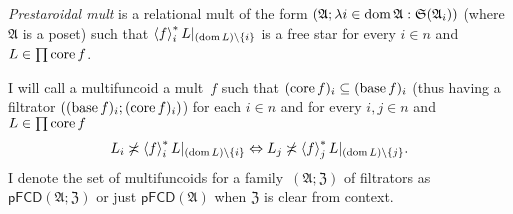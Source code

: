 \begin{defn}
\emph{Prestaroidal mult} is a relational mult of the form $(\mathfrak{A};\lambda i\in\operatorname{dom}\mathfrak{A}:\mathfrak{S}(\mathfrak{A}_{i}))$
(where $\mathfrak{A}$ is a poset) such that $\left\langle f\right\rangle ^{\ast}_{i}L|_{(\operatorname{dom} L)\setminus\{i\}}$
is a free star for every $i\in n$ and $L\in\prod\operatorname{core} f$.
\end{defn}

\begin{defn}
I will call a multifuncoid a mult~$f$ such
that $(\operatorname{core} f)_{i}\subseteq(\operatorname{base} f)_{i}$ (thus having a filtrator
$((\operatorname{base} f)_{i};(\operatorname{core} f)_{i})$) for each $i\in n$ and for every
$i,j\in n$ and $L\in\prod\operatorname{core} f$ 
\begin{equation}
L_{i}\not\asymp\left\langle f\right\rangle ^{\ast}_{i}L|_{(\operatorname{dom} L)\setminus\{i\}}\Leftrightarrow L_{j}\not\asymp\left\langle f\right\rangle ^{\ast}_{j}L|_{(\operatorname{dom} L)\setminus\{j\}}.\label{alpha-cond}
\end{equation}
I denote the set of multifuncoids for a family~$(\mathfrak{A};\mathfrak{Z})$ of filtrators as
$\mathsf{pFCD}(\mathfrak{A};\mathfrak{Z})$ or just $\mathsf{pFCD}(\mathfrak{A})$ when $\mathfrak{Z}$ is clear from context.
\end{defn}

